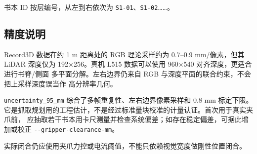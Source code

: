 \documentclass[
  chinese,
  11pt,
  a4paper,
]{article}
\begin{document}
书本 ID 按层编号，从左到右依次为
\texttt{S1-01}、\texttt{S1-02}\ldots\ldots。

\subsection{精度说明}\label{ux7cbeux5ea6ux8bf4ux660e}

Record3D 数据在约 1 m 距离处的 RGB 理论采样约为 0.7--0.9 mm/像素，但其
LiDAR 深度仅为 192×256。真机 L515 数据可以使用 960×540
对齐深度，更适合进行书脊/侧面 多平面分解。左右边界仍来自 RGB
与深度平面的联合约束，不会把上采样深度误当作 高分辨率几何。

\texttt{uncertainty\_95\_mm} 综合了多帧重复性、左右边界像素采样和 0.8 mm
标定下限。
它是抓取规划用的工程估计，不是经过标准量块校准的计量认证。首次用于真实夹爪前，
应抽取若干书本用卡尺测量并检查系统偏差；如存在稳定偏差，可据此增加或校正
\texttt{-\/-gripper-clearance-mm}。

实际闭合仍应使用夹爪力控或电流阈值，不能只依赖视觉宽度做刚性位置闭合。
\end{document}
